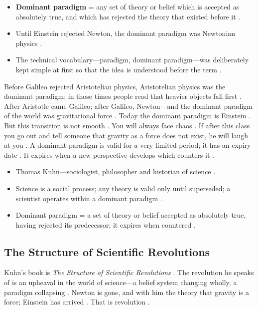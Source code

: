 \begin{KeyConcept}
\begin{itemize}
    \item \textbf{Dominant paradigm} = any set of theory or belief which is accepted as absolutely true, and which has rejected the theory that existed before it .
    \item Until Einstein rejected Newton, the dominant paradigm was Newtonian physics .
    \item The technical vocabulary---paradigm, dominant paradigm---was deliberately kept simple at first so that the idea is understood before the term .
\end{itemize}
\end{KeyConcept}

\begin{ExampleBox}
Before Galileo rejected Aristotelian physics, Aristotelian physics was the dominant paradigm; in those times people read that heavier objects fall first . After Aristotle came Galileo; after Galileo, Newton---and the dominant paradigm of the world was gravitational force . Today the dominant paradigm is Einstein . But this transition is not smooth . You will always face chaos . If after this class you go out and tell someone that gravity as a force does not exist, he will laugh at you . A dominant paradigm is valid for a very limited period; it has an expiry date . It expires when a new perspective develops which counters it .
\end{ExampleBox}

\begin{QuickRevision}
\begin{itemize}
    \item Thomas Kuhn---sociologist, philosopher and historian of science .
    \item Science is a social process; any theory is valid only until superseded; a scientist operates within a dominant paradigm .
    \item Dominant paradigm = a set of theory or belief accepted as absolutely true, having rejected its predecessor; it expires when countered .
\end{itemize}
\end{QuickRevision}

\subsection{The Structure of Scientific Revolutions}
Kuhn's book is \textit{The Structure of Scientific Revolutions} . The revolution he speaks of is an upheaval in the world of science---a belief system changing wholly, a paradigm collapsing . Newton is gone, and with him the theory that gravity is a force; Einstein has arrived . That is revolution .

